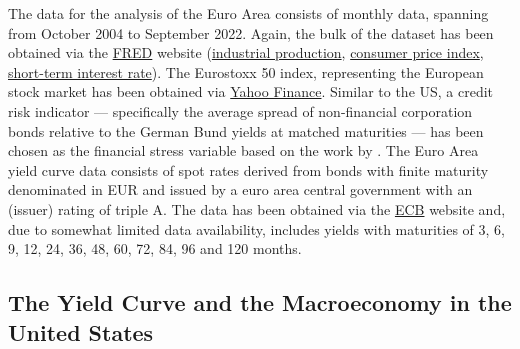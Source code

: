 The data for the analysis of the Euro Area consists of monthly data, spanning from October 2004 to September 2022. Again, the bulk of the dataset has been obtained via the \href{https://fred.stlouisfed.org/}{FRED} website (\href{https://fred.stlouisfed.org/series/EA19PRINTO01GYSAM}{industrial production}, \href{https://fred.stlouisfed.org/series/CPHPTT01EZM659N}{consumer price index}, \href{https://fred.stlouisfed.org/series/IR3TIB01EZM156N}{short-term interest rate}). The Eurostoxx 50 index, representing the European stock market
has been obtained via \href{https://finance.yahoo.com/}{Yahoo Finance}.
Similar to the US, a credit risk indicator --- specifically the average spread of non-financial corporation bonds relative to the German Bund yields at matched maturities --- has been chosen as the financial stress variable based on the work by \citet{Gilhrist_2014}.
The Euro Area yield curve data consists of spot rates derived from bonds with finite maturity denominated in EUR and issued by a euro area central government with an (issuer) rating of triple A. The data has been obtained via the \href{https://www.ecb.europa.eu/stats/financial_markets_and_interest_rates/euro_area_yield_curves/html/index.en.html}{ECB} website and, due to somewhat limited data availability, includes yields with maturities of 3, 6, 9, 12, 24, 36, 48, 60, 72, 84, 96 and 120 months.



\subsection{The Yield Curve and the Macroeconomy in the United States}
\label{sec:analysis_us}

